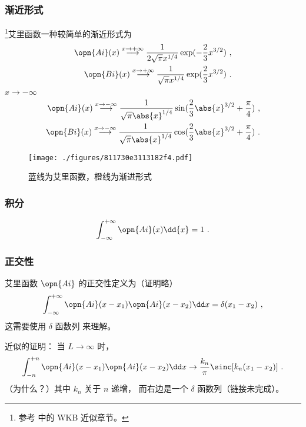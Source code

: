 \subsubsection{渐近形式}
\footnote{参考 \cite{GriffQ} 中的 WKB 近似章节。}艾里函数一种较简单的渐近形式为
\begin{align}\label{eq_AiryF_3}
\opn{Ai}(x) \overset{x \to +\infty}{\longrightarrow} \frac{1}{2\sqrt{\pi} x^{1/4}} \exp(-\frac{2}{3}x^{3/2})~,\\
\opn{Bi}(x) \overset{x \to +\infty}{\longrightarrow} \frac{1}{\sqrt{\pi} x^{1/4}} \exp(\frac{2}{3}x^{3/2})~.
\end{align}
$x \to -\infty$
\begin{align}
\opn{Ai}(x) \overset{x \to -\infty}{\longrightarrow} \frac{1}{\sqrt{\pi} \abs{x}^{1/4}} \sin(\frac{2}{3}\abs{x}^{3/2}+\frac{\pi}{4})~,\\
\opn{Bi}(x) \overset{x \to -\infty}{\longrightarrow} \frac{1}{\sqrt{\pi} \abs{x}^{1/4}} \cos(\frac{2}{3}\abs{x}^{3/2}+\frac{\pi}{4})~.
\end{align}
\begin{figure}[ht]
\centering
\texttt{[image: ./figures/811730e3113182f4.pdf]}
\caption{蓝线为艾里函数，橙线为渐进形式} \label{fig_AiryF_2}
\end{figure}

\subsubsection{积分}
\begin{equation}
\int_{-\infty}^{+\infty} \opn{Ai}(x) \dd{x} = 1~.
\end{equation}


\subsubsection{正交性}
艾里函数 $\opn{Ai}$ 的正交性定义为（证明略）
\begin{equation}
\int_{-\infty}^{+\infty} \opn{Ai}(x-x_1)\opn{Ai}(x-x_2)\dd x=\delta(x_1-x_2)~,
\end{equation}
这需要使用 $\delta$ 函数列 来理解。

近似的证明： 当 $L\to \infty$ 时，
\begin{equation}
\int_{-n}^{+n} \opn{Ai}(x-x_1)\opn{Ai}(x-x_2)\dd x \to \frac{k_n}{\pi}\sinc[k_n (x_1 - x_2)]~.
\end{equation}
（为什么？）其中 $k_n$ 关于 $n$ 递增， 而右边是一个 $\delta$ 函数列（链接未完成）。

